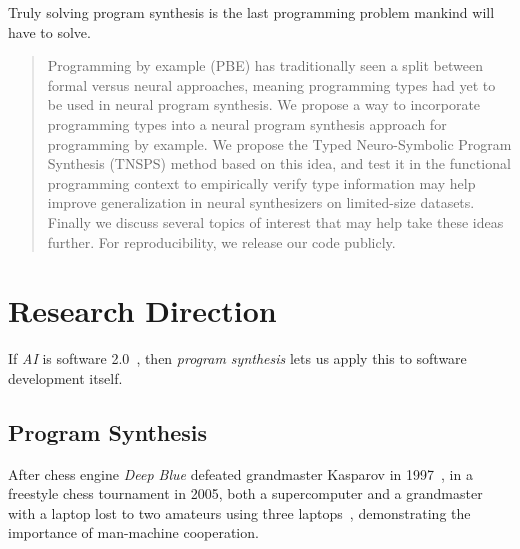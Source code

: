 \documentclass{article}
\begin{document}


\pagebreak

\epigraph{
    Truly solving program synthesis is the last programming problem mankind will have to solve.
}{
    \textit{\citet{nps}}
}


\pagebreak

\tableofcontents

\pagebreak

\begin{abstract}

    Programming by example (PBE) has traditionally seen a split between formal versus neural approaches,
    meaning programming types had yet to be used in neural program synthesis.
    We propose a way to incorporate programming types into a neural program synthesis approach for programming by example.
    We propose the Typed Neuro-Symbolic Program Synthesis (TNSPS) method based on this idea,
    and test it in the functional programming context to empirically verify type information may help improve generalization in neural synthesizers on limited-size datasets.
    Finally we discuss several topics of interest that may help take these ideas further.
    For reproducibility, we release our code publicly.~\citep{code}

\end{abstract}

\section{Research Direction} %

If \emph{AI} is software 2.0~\citep{software20},
then \emph{program synthesis} lets us apply this to software development itself.

\subsection{Program Synthesis}


After chess engine \emph{Deep Blue} defeated grandmaster Kasparov in 1997~\citep{deepblue},
in a freestyle chess tournament in 2005,
both a supercomputer and a grandmaster with a laptop lost to two amateurs using three laptops~\citep{kasparov},
demonstrating the importance of man-machine cooperation.
\end{document}
